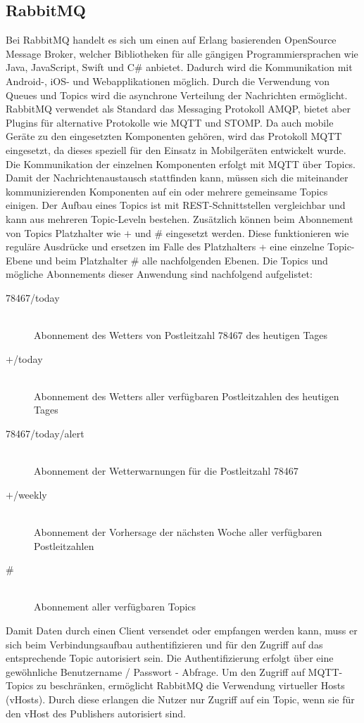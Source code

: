 \documentclass[paper,oneside,onecolumn,notitlepage,bibtotocnumbered,fontsize=12pt,bigheadings,ngerman]{scrartcl}
\begin{document}
\subsection{RabbitMQ}\label{rabbitmq}
Bei RabbitMQ handelt es sich um einen auf Erlang basierenden OpenSource Message Broker, welcher Bibliotheken für alle gängigen Programmiersprachen wie Java, JavaScript, Swift und C\# anbietet. Dadurch wird die Kommunikation mit Android-, iOS- und Webapplikationen möglich. Durch die Verwendung von Queues und Topics wird die asynchrone Verteilung der Nachrichten ermöglicht. RabbitMQ verwendet als Standard das Messaging Protokoll AMQP, bietet aber Plugins für alternative Protokolle wie MQTT und STOMP. Da auch mobile Geräte zu den eingesetzten Komponenten gehören, wird das Protokoll MQTT eingesetzt, da dieses speziell für den Einsatz in Mobilgeräten entwickelt wurde. Die Kommunikation der einzelnen Komponenten erfolgt mit MQTT über Topics. Damit der Nachrichtenaustausch stattfinden kann, müssen sich die miteinander kommunizierenden Komponenten auf ein oder mehrere gemeinsame Topics einigen. Der Aufbau eines Topics ist mit REST-Schnittstellen vergleichbar und kann aus mehreren Topic-Leveln bestehen. Zusätzlich können beim Abonnement von Topics Platzhalter wie $+$ und \# eingesetzt werden. Diese funktionieren wie reguläre Ausdrücke und ersetzen im Falle des Platzhalters + eine einzelne Topic-Ebene und beim Platzhalter \# alle nachfolgenden Ebenen. Die Topics und mögliche Abonnements dieser Anwendung sind nachfolgend aufgelistet:
\begin{description}
\item[78467/today]\hfill \\ Abonnement des Wetters von Postleitzahl 78467 des heutigen Tages
\item[$+$/today]\hfill \\ Abonnement des Wetters aller verfügbaren Postleitzahlen des heutigen Tages
\item[78467/today/alert]\hfill \\ Abonnement der Wetterwarnungen für die Postleitzahl 78467
\item[$+$/weekly]\hfill \\ Abonnement der Vorhersage der nächsten Woche aller verfügbaren Postleitzahlen
\item[\#]\hfill \\ Abonnement aller verfügbaren Topics
\end{description}
Damit Daten durch einen Client versendet oder empfangen werden kann, muss er sich beim Verbindungsaufbau authentifizieren und für den Zugriff auf das entsprechende Topic autorisiert sein. Die Authentifizierung erfolgt über eine gewöhnliche Benutzername / Passwort - Abfrage. Um den Zugriff auf MQTT-Topics zu beschränken, ermöglicht RabbitMQ die Verwendung virtueller Hosts (vHosts). Durch diese erlangen die Nutzer nur Zugriff auf ein Topic, wenn sie für den vHost des Publishers autorisiert sind. 
\end{document}

